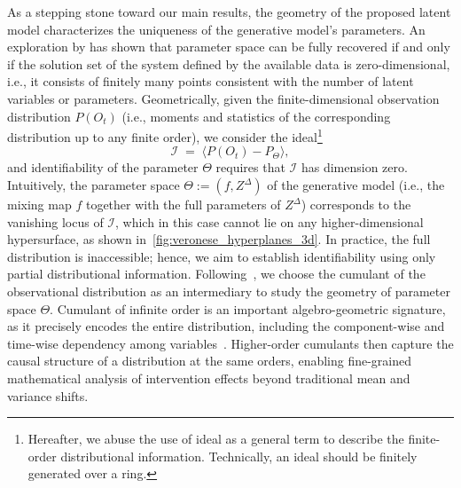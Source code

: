 \documentclass[10pt]{article}
\numberwithin{figure}{section}
\begin{document}
As a stepping stone toward our main results, the geometry of the proposed latent model characterizes the uniqueness of the generative model's parameters. An exploration by \citet{carreno2024linear} has shown that parameter space can be fully recovered if and only if the solution set of the system defined by the available data is zero-dimensional, i.e., it consists of finitely many points consistent with the number of latent variables or parameters. Geometrically, given the finite-dimensional observation distribution $P(O_t)$ (i.e., moments and statistics of the corresponding distribution up to any finite order), we consider the ideal\footnote{Hereafter, we abuse the use of ideal as a general term to describe the finite-order distributional information. Technically, an ideal should be finitely generated over a ring.}
\begin{equation}\label{distributionideal}
    \mathcal{I} \;=\; \langle P(O_t) - P_{\Theta} \rangle,
\end{equation}
and identifiability of the parameter $\Theta$ requires that $\mathcal{I}$ has dimension zero. Intuitively, the parameter space $\Theta:= (f, Z^{\Delta})$ of the generative model (i.e., the mixing map $f$ together with the full parameters of $Z^{\Delta}$) corresponds to the vanishing locus of $\mathcal{I}$, which in this case cannot lie on any higher-dimensional hypersurface, as shown in~\autoref{fig:veronese_hyperplanes_3d}. In practice, the full distribution is inaccessible; hence, we aim to establish identifiability using only partial distributional information. Following~\citet{wang_identifiability_2024}, we choose the cumulant of the observational distribution as an intermediary to study the geometry of parameter space $\Theta$. Cumulant of infinite order is an important algebro-geometric signature, as it precisely encodes the entire distribution, including the component-wise and time-wise dependency among variables~\citep{achab_uncovering_2018,jovanovic_cumulants_2015,landsberg2011tensors}. Higher-order cumulants then capture the causal structure of a distribution at the same orders, enabling fine-grained mathematical analysis of intervention effects beyond traditional mean and variance shifts.  
\end{document}
